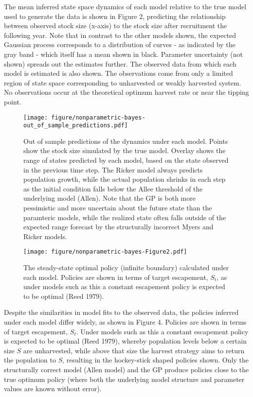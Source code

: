 \documentclass[author-year, review]{elsarticle} %
\makeatletter
\def\maxwidth{\ifdim\Gin@nat@width>\linewidth\linewidth
\else\Gin@nat@width\fi}
\let\Oldincludegraphics\includegraphics
\renewcommand{\includegraphics}[1]{\Oldincludegraphics[width=\maxwidth]{#1}}
\makeatother
\begin{document}
The mean inferred state space dynamics of each model relative to the
true model used to generate the data is shown in Figure 2, predicting
the relationship between observed stock size (x-axis) to the stock size
after recruitment the following year. Note that in contrast to the other
models shown, the expected Gaussian process corresponds to a
distribution of curves - as indicated by the gray band - which itself
has a mean shown in black. Parameter uncertainty (not shown) spreads out
the estimates further. The observed data from which each model is
estimated is also shown. The observations come from only a limited
region of state space corresponding to unharvested or weakly harvested
system. No observations occur at the theoretical optimum harvest rate or
near the tipping point.

\begin{figure}[htbp]
\centering
\texttt{[image: figure/nonparametric-bayes-out\_of\_sample\_predictions.pdf]}
\caption{Out of sample predictions of the dynamics under each model.
Points show the stock size simulated by the true model. Overlay shows
the range of states predicted by each model, based on the state observed
in the previous time step. The Ricker model always predicts population
growth, while the actual population shrinks in each step as the initial
condition falls below the Allee threshold of the underlying model
(Allen). Note that the GP is both more pessimistic and more uncertain
about the future state than the paramteric models, while the realized
state often falls outside of the expected range forecast by the
structurally incorrect Myers and Ricker models.}
\end{figure}

\begin{figure}[htbp]
\centering
\texttt{[image: figure/nonparametric-bayes-Figure2.pdf]}
\caption{The steady-state optimal policy (infinite boundary) calculated
under each model. Policies are shown in terms of target escapement,
$S_t$, as under models such as this a constant escapement policy is
expected to be optimal (Reed 1979).}
\end{figure}

Despite the similarities in model fits to the observed data, the
policies inferred under each model differ widely, as shown in Figure 4.
Policies are shown in terms of target escapement, $S_t$. Under models
such as this a constant escapement policy is expected to be optimal
(Reed 1979), whereby population levels below a certain size $S$ are
unharvested, while above that size the harvest strategy aims to return
the population to $S$, resulting in the hockey-stick shaped policies
shown. Only the structurally correct model (Allen model) and the GP
produce policies close to the true optimum policy (where both the
underlying model structure and parameter values are known without
error).
\end{document}
